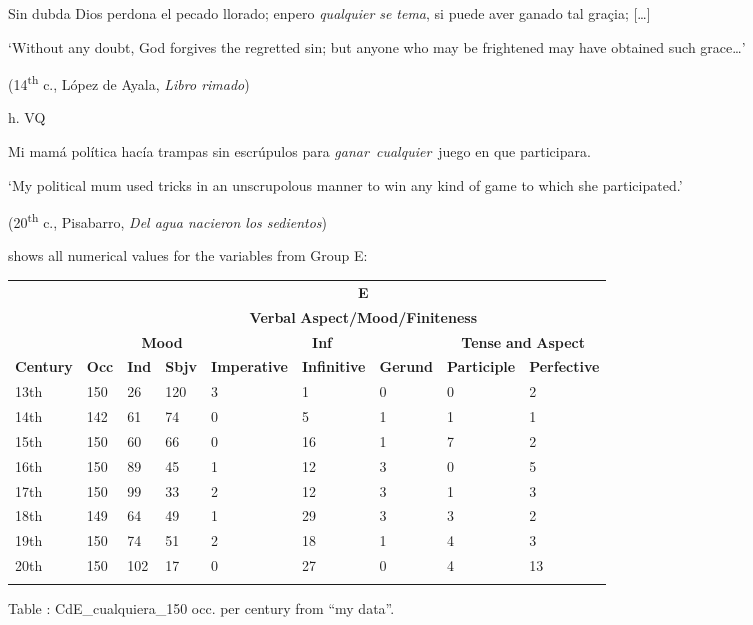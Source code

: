 \documentclass[output=paper]{langscibook}
\begin{document}
    Sin dubda Dios perdona el pecado llorado; enpero \textit{qualquier} \textit{se tema}, si puede aver ganado tal graçia; […]

    ‘Without any doubt, God forgives the regretted sin; but anyone who may be frightened may have obtained such grace…’

    (14\textsuperscript{th} c., López de Ayala, \textit{Libro rimado})

  h.  VQ

    Mi mamá política hacía trampas sin escrúpulos para \textit{ganar~cualquier}~juego en que participara. 

    ‘My political mum used tricks in an unscrupolous manner to win any kind of game to which she participated.’

    (20\textsuperscript{th} c., Pisabarro, \textit{Del agua nacieron los sedientos})

 shows all numerical values for the variables from Group E:


\begin{tabularx}{\textwidth}{XXXXXXXXX}

\lsptoprule
\multicolumn{1}{c}{} &  & \multicolumn{7}{c}{ \textbf{E}}\\
\multicolumn{1}{c}{} &  & \multicolumn{7}{c}{ \textbf{Verbal} \textbf{Aspect/Mood/Finiteness}}\\
&  & \multicolumn{2}{c}{ \textbf{Mood}} & \multicolumn{3}{c}{ \textbf{Inf}} & \multicolumn{2}{c}{ \textbf{Tense} \textbf{and} \textbf{Aspect}}\\
 \textbf{Century} & \textbf{Occ} & \textbf{Ind} & \textbf{Sbjv} & \textbf{Imperative} & \textbf{Infinitive} & \textbf{Gerund} & \textbf{Participle} & \textbf{Perfective}\\
 13th & 150 & 26 & 120 & 3 & 1 & 0 & 0 & 2\\
 14th & 142 & 61 & 74 & 0 & 5 & 1 & 1 & 1\\
 15th & 150 & 60 & 66 & 0 & 16 & 1 & 7 & 2\\
 16th & 150 & 89 & 45 & 1 & 12 & 3 & 0 & 5\\
 17th & 150 & 99 & 33 & 2 & 12 & 3 & 1 & 3\\
 18th & 149 & 64 & 49 & 1 & 29 & 3 & 3 & 2\\
 19th & 150 & 74 & 51 & 2 & 18 & 1 & 4 & 3\\
 20th & 150 & 102 & 17 & 0 & 27 & 0 & 4 & 13\\
\lspbottomrule
\end{tabularx}
Table : CdE\_cualquiera\_150 occ. per century from “my data”.
\end{document}
